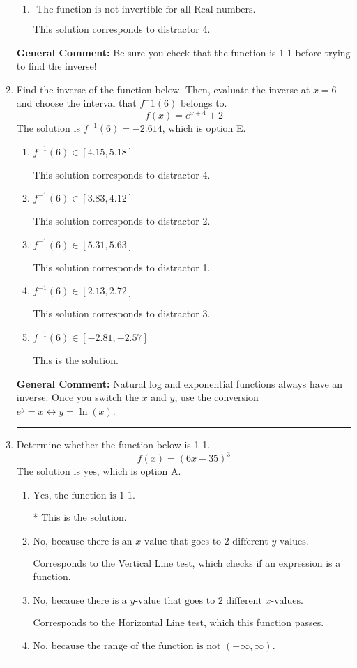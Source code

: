 \documentclass{extbook}[14pt]
\newcommand{\litem}[1]{\item #1

\rule{\textwidth}{0.4pt}}
\begin{document}
\begin{enumerate}
{\begin{enumerate}[label=\Alph*.]
 This solution corresponds to distractor 3.
\item \( \text{ The function is not invertible for all Real numbers. } \)

 This solution corresponds to distractor 4.
\end{enumerate}

\textbf{General Comment:} Be sure you check that the function is 1-1 before trying to find the inverse!
}
\litem{
Find the inverse of the function below. Then, evaluate the inverse at $x = 6$ and choose the interval that $f^-1(6)$ belongs to.
\[ f(x) = e^{x+4}+2 \]The solution is \( f^{-1}(6) = -2.614 \), which is option E.\begin{enumerate}[label=\Alph*.]
\item \( f^{-1}(6) \in [4.15, 5.18] \)

 This solution corresponds to distractor 4.
\item \( f^{-1}(6) \in [3.83, 4.12] \)

 This solution corresponds to distractor 2.
\item \( f^{-1}(6) \in [5.31, 5.63] \)

 This solution corresponds to distractor 1.
\item \( f^{-1}(6) \in [2.13, 2.72] \)

 This solution corresponds to distractor 3.
\item \( f^{-1}(6) \in [-2.81, -2.57] \)

 This is the solution.
\end{enumerate}

\textbf{General Comment:} Natural log and exponential functions always have an inverse. Once you switch the $x$ and $y$, use the conversion $ e^y = x \leftrightarrow y=\ln(x)$.
}
\litem{
Determine whether the function below is 1-1.
\[ f(x) = (6 x - 35)^3 \]The solution is \( \text{yes} \), which is option A.\begin{enumerate}[label=\Alph*.]
\item \( \text{Yes, the function is 1-1.} \)

* This is the solution.
\item \( \text{No, because there is an $x$-value that goes to 2 different $y$-values.} \)

Corresponds to the Vertical Line test, which checks if an expression is a function.
\item \( \text{No, because there is a $y$-value that goes to 2 different $x$-values.} \)

Corresponds to the Horizontal Line test, which this function passes.
\item \( \text{No, because the range of the function is not $(-\infty, \infty)$.} \)


\end{enumerate}}
\end{enumerate}
\end{document}
